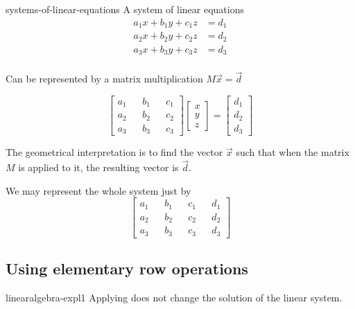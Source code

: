 \documentclass[preview]{standalone}
\begin{document}
\begin{snippet}{systems-of-linear-equations}
    A system of linear equations
    \begin{align*}
        a_1x + b_1y + c_1z &= d_1 \\
        a_2x + b_2y + c_2z &= d_2 \\
        a_3x + b_3y + c_3z &= d_3 \\
    \end{align*}

    Can be represented by a matrix multiplication \(M\vec{x}=\vec{d}\)

    \[
        \begin{bmatrix} 
            a_1 && b_1 && c_1 \\
            a_2 && b_2 && c_2 \\
            a_3 && b_3 && c_3
        \end{bmatrix}
        \begin{bmatrix}
            x \\ y \\ z
        \end{bmatrix}
        =
        \begin{bmatrix}
            d_1 \\ d_2 \\ d_3
        \end{bmatrix}
    \]

    The geometrical interpretation is to find the vector \(\vec{x}\)
    such that when the matrix \(M\) is applied to it, the resulting vector is \(\vec{d}\).

    We may represent the whole system just by
    \[
        \begin{bmatrix} 
            a_1 && b_1 && c_1 && d_1 \\
            a_2 && b_2 && c_2 && d_2 \\
            a_3 && b_3 && c_3 && d_3
        \end{bmatrix}
    \]
\end{snippet}

\subsection{Using elementary row operations}

\begin{snippet}{linearalgebra-expl1}
    Applying 
    does not change the solution of the linear system.
\end{snippet}
\end{document}

